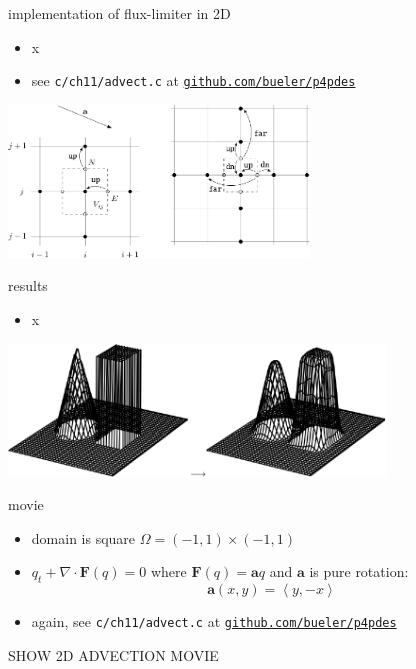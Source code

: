 \documentclass[10pt,hyperref,dvipsnames]{beamer}
\newcommand{\ba}{\mathbf{a}}
\newcommand{\bF}{\mathbf{F}}
\newcommand{\Div}{\nabla\cdot}
\begin{document}
\begin{frame}{implementation of flux-limiter in 2D}

\begin{itemize}
\item x
\item see \texttt{c/ch11/advect.c} at \href{https://github.com/bueler/p4pdes}{\texttt{github.com/bueler/p4pdes}}
\end{itemize}

\begin{center}
\includegraphics[width=0.6\textwidth]{figs/bueler11p8}
\end{center}

\end{frame}


\begin{frame}{results}

\begin{itemize}
\item x
\end{itemize}

\hfill \includegraphics[width=0.75\textwidth]{figs/bueler11p7}
\end{frame}


\begin{frame}{movie}

\begin{itemize}
\item domain is square $\Omega = (-1,1) \times (-1,1)$
\item $q_t + \Div \bF(q) = 0$ where $\bF(q) = \ba q$ and $\ba$ is pure rotation:
    $$\ba(x,y) = \left<y,-x\right>$$
\item again, see \texttt{c/ch11/advect.c} at \href{https://github.com/bueler/p4pdes}{\texttt{github.com/bueler/p4pdes}}
\end{itemize}

\vspace{10mm}
\begin{center}
\alert{SHOW 2D ADVECTION MOVIE}
\end{center}

\end{frame}
\end{document}
